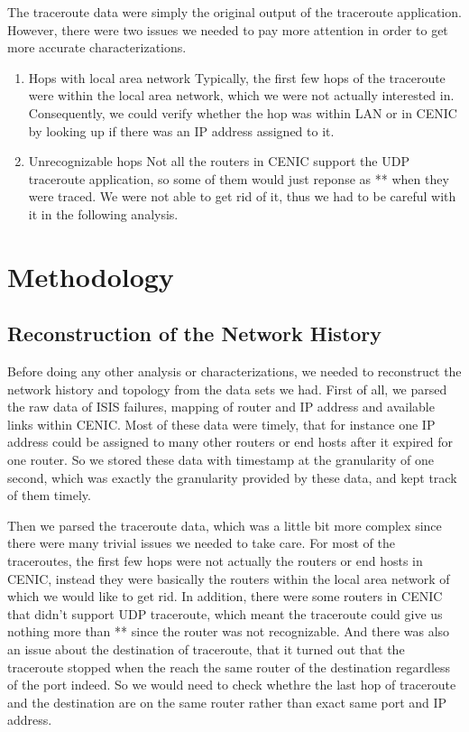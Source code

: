 \documentclass[conference, twocolumn, oneside, 10pt]{IEEEtran}
\begin{document}
The traceroute data were simply the original output of the traceroute application. However, there were two issues we needed to pay more attention in order to get more accurate characterizations.

\begin{enumerate}

\item{Hops with local area network} Typically, the first few hops of the traceroute were within the local area network, which we were not actually interested in. Consequently, we could verify whether the hop was within LAN or in CENIC by looking up if there was an IP address assigned to it.

\item{Unrecognizable hops} Not all the routers in CENIC support the UDP traceroute application, so some of them would just reponse as ** when they were traced. We were not able to get rid of it, thus we had to be careful with it in the following analysis.

\end{enumerate}

\section{Methodology}
\label{sec:sec4}

\subsection{Reconstruction of the Network History}

Before doing any other analysis or characterizations, we needed to reconstruct the network history and topology from the data sets we had. First of all, we parsed the raw data of ISIS failures, mapping of router and IP address and available links within CENIC. Most of these data were timely, that for instance one IP address could be assigned to many other routers or end hosts after it expired for one router. So we stored these data with timestamp at the granularity of one second, which was exactly the granularity provided by these data, and kept track of them timely.

Then we parsed the traceroute data, which was a little bit more complex since there were many trivial issues we needed to take care. For most of the traceroutes, the first few hops were not actually the routers or end hosts in CENIC, instead they were basically the routers within the local area network of which we would like to get rid. In addition, there were some routers in CENIC that didn't support UDP traceroute, which meant the traceroute could give us nothing more than ** since the router was not recognizable. And there was also an issue about the destination of traceroute, that it turned out that the traceroute stopped when the reach the same router of the destination regardless of the port indeed. So we would need to check whethre the last hop of traceroute and the destination are on the same router rather than exact same port and IP address.
\end{document}
